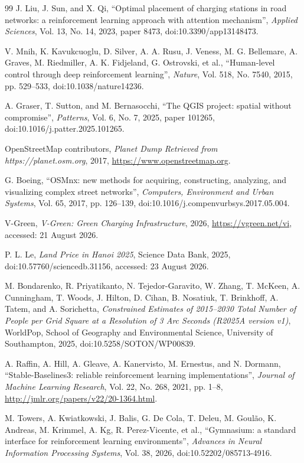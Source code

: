 \documentclass[graybox]{svmult}
\begin{document}
\begin{thebibliography}{99}
J. Liu, J. Sun, and X. Qi, ``Optimal placement of charging stations in road
networks: a reinforcement learning approach with attention mechanism'', {\it
Applied Sciences}, Vol. 13, No. 14, 2023, paper 8473,
doi:10.3390/app13148473.

V. Mnih, K. Kavukcuoglu, D. Silver, A. A. Rusu, J. Veness, M. G. Bellemare, A.
Graves, M. Riedmiller, A. K. Fidjeland, G. Ostrovski, et al., ``Human-level
control through deep reinforcement learning'', {\it Nature}, Vol. 518, No.
7540, 2015, pp. 529--533, doi:10.1038/nature14236.

A. Graser, T. Sutton, and M. Bernasocchi, ``The QGIS project: spatial without
compromise'', {\it Patterns}, Vol. 6, No. 7, 2025, paper 101265,
doi:10.1016/j.patter.2025.101265.

OpenStreetMap contributors, {\it Planet Dump Retrieved from
https://planet.osm.org}, 2017, \url{https://www.openstreetmap.org}.

G. Boeing, ``OSMnx: new methods for acquiring, constructing, analyzing, and
visualizing complex street networks'', {\it Computers, Environment and Urban
Systems}, Vol. 65, 2017, pp. 126--139,
doi:10.1016/j.compenvurbsys.2017.05.004.

V-Green, {\it V-Green: Green Charging Infrastructure}, 2026,
\url{https://vgreen.net/vi}, accessed: 21 August 2026.

P. L. Le, {\it Land Price in Hanoi 2025}, Science Data Bank, 2025,
doi:10.57760/sciencedb.31156, accessed: 23 August 2026.

M. Bondarenko, R. Priyatikanto, N. Tejedor-Garavito, W. Zhang, T. McKeen, A.
Cunningham, T. Woods, J. Hilton, D. Cihan, B. Nosatiuk, T. Brinkhoff, A.
Tatem, and A. Sorichetta, {\it Constrained Estimates of 2015--2030 Total
Number of People per Grid Square at a Resolution of 3 Arc Seconds (R2025A
version v1)}, WorldPop, School of Geography and Environmental Science,
University of Southampton, 2025, doi:10.5258/SOTON/WP00839.

A. Raffin, A. Hill, A. Gleave, A. Kanervisto, M. Ernestus, and N. Dormann,
``Stable-Baselines3: reliable reinforcement learning implementations'', {\it
Journal of Machine Learning Research}, Vol. 22, No. 268, 2021, pp. 1--8,
\url{http://jmlr.org/papers/v22/20-1364.html}.

M. Towers, A. Kwiatkowski, J. Balis, G. De Cola, T. Deleu, M. Goul\~ao, K.
Andreas, M. Krimmel, A. Kg, R. Perez-Vicente, et al., ``Gymnasium: a standard
interface for reinforcement learning environments'', {\it Advances in Neural
Information Processing Systems}, Vol. 38, 2026, doi:10.52202/085713-4916.

\end{thebibliography}
\end{document}
